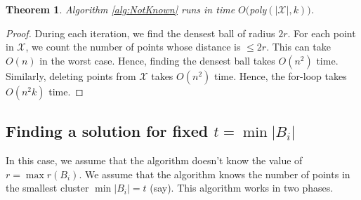 \documentclass[twoside]{article}
\newtheorem{theorem}{Theorem}
\begin{document}
\begin{theorem}
Algorithm \ref{alg:NotKnown} runs in time $O($poly$(|\mathcal{X}|,k))$.
\end{theorem}
\begin{proof}
During each iteration, we find the densest ball of radius $2r$. For each point in $\mathcal{X}$, we count the number of points whose distance is $\le 2r$. This can take $O(n)$ in the worst case. Hence, finding the densest ball takes $O(n^2)$ time. Similarly, deleting points from $\mathcal{X}$ takes $O(n^2)$ time. Hence, the for-loop takes $O(n^2k)$ time.
\end{proof}

\subsection{Finding a solution for  fixed $t = \min |B_i|$}
In this case, we assume that the algorithm doesn't know the value of $r = \max r(B_i)$. We assume that the algorithm knows the number of points in the smallest cluster $\min |B_i| = t$ (say). This algorithm works in two phases.
\end{document}
